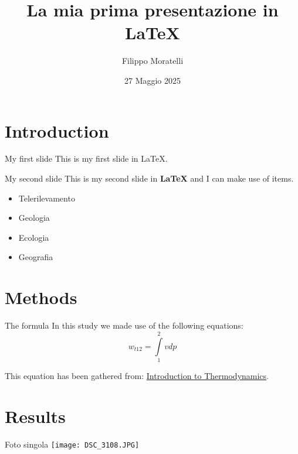 \documentclass{beamer}
\title{La mia prima presentazione in LaTeX}
\author{Filippo Moratelli}
\date{27 Maggio 2025}
\begin{document}
\maketitle


\section{Introduction}

\begin{frame}{My first slide}
    This is my first slide in LaTeX.
\end{frame}

\begin{frame}{My second slide}
    This is my second slide in \textbf{LaTeX} and I can make use of items.
    \begin{itemize}
        \item Telerilevamento
        \item \pause Geologia
        \item \pause Ecologia
        \item \pause Geografia %
    \end{itemize}
\end{frame}

\section{Methods}
\begin{frame}{The formula}
    In this study we made use of the following equations:
    \begin{equation}
        w_{t12}=\int\limits_1^2vdp
    \end{equation}
    
    \bigskip
    This equation has been gathered from:
    \href{https://www.recip.org/tutorial-introduction-to-thermodynamics/}{Introduction to Thermodynamics}.
\end{frame}


\section{Results}
\begin{frame}{Foto singola}
    \texttt{[image: DSC\_3108.JPG]}
\end{frame}
\end{document}
